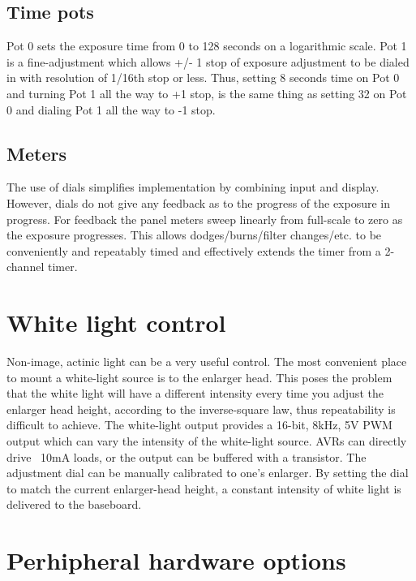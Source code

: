 \documentclass[dvips,12pt]{article}
\begin{document}
\subsection{Time pots}
Pot 0 sets the exposure time from 0 to 128 seconds on a logarithmic scale. Pot 1 is a fine-adjustment which allows +/- 1 stop of exposure adjustment to be dialed in with resolution of 1/16th stop or less. Thus, setting 8 seconds time on Pot 0 and turning Pot 1 all the way to +1 stop, is the same thing as setting 32 on Pot 0 and dialing Pot 1 all the way to -1 stop. 

\subsection{Meters} 

The use of dials simplifies implementation by combining input and display. However, dials do
not give any feedback as to the progress of the exposure in progress. For feedback the panel meters sweep linearly from full-scale to zero as the exposure progresses. This allows
dodges/burns/filter changes/etc. to be conveniently and repeatably timed and effectively
extends the timer from a 2-channel timer.

\section{White light control}

Non-image, actinic light can be a very useful control. The most convenient place to mount a
white-light source is to the enlarger head. This poses the problem that the white light will
have a different intensity every time you adjust the enlarger head height, according to the
inverse-square law, thus repeatability is difficult to achieve. The white-light output provides
a 16-bit, 8kHz, 5V PWM output which can vary the intensity of the white-light source. AVRs can
directly drive ~10mA loads, or the output can be buffered with a transistor. The adjustment dial can be manually calibrated to one's enlarger. By setting the dial to match the current enlarger-head height, a constant intensity of white light is delivered to the baseboard. 

\section{Perhipheral hardware options}
\end{document}
